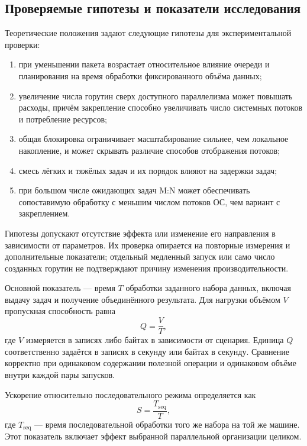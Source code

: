 \subsection{Проверяемые гипотезы и показатели исследования}
\label{subsec:research-hypotheses}

Теоретические положения задают следующие гипотезы для экспериментальной проверки:
\begin{enumerate}
  \item при уменьшении пакета возрастает относительное влияние очереди и планирования на время
    обработки фиксированного объёма данных;
  \item увеличение числа горутин сверх доступного параллелизма может повышать расходы,
    причём закрепление способно увеличивать число системных потоков и потребление ресурсов;
  \item общая блокировка ограничивает масштабирование сильнее, чем локальное накопление,
    и может скрывать различие способов отображения потоков;
  \item смесь лёгких и тяжёлых задач и их порядок влияют на задержки задач;
  \item при большом числе ожидающих задач M:N может обеспечивать сопоставимую обработку
    с меньшим числом потоков ОС, чем вариант с закреплением.
\end{enumerate}

Гипотезы допускают отсутствие эффекта или изменение его направления в зависимости от параметров.
  Их проверка опирается на повторные измерения и дополнительные показатели; отдельный медленный
  запуск или само число созданных горутин не подтверждают причину изменения производительности.

Основной показатель — время $T$ обработки заданного набора данных, включая выдачу задач
  и получение объединённого результата. Для нагрузки объёмом $V$ пропускная способность равна
\begin{equation}
  Q = \frac{V}{T},
  \label{eq:throughput}
\end{equation}
где $V$ измеряется в записях либо байтах в зависимости от сценария. Единица $Q$ соответственно
  задаётся в записях в секунду или байтах в секунду. Сравнение корректно при одинаковом содержании
  полезной операции и одинаковом объёме внутри каждой пары запусков.

Ускорение относительно последовательного режима определяется как
\begin{equation}
  S = \frac{T_{\mathrm{seq}}}{T},
  \label{eq:measured-speedup}
\end{equation}
где $T_{\mathrm{seq}}$ — время последовательной обработки того же набора на той же машине.
  Этот показатель включает эффект выбранной параллельной организации целиком.

